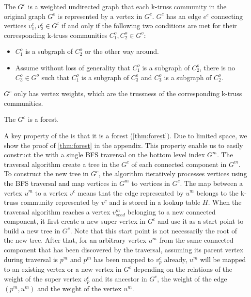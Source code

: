 \begin{Def}[\Treeindex{}]
The \treeindex{} $G^c$ is a weighted undirected graph that each k-truss community in the original graph $G^o$ is represented by a vertex in $G^c$. $G^c$ has an edge $e^c$ connecting vertices $v^{c}_{1}, v^{c}_{2} \in G^{t}$ if and only if the following two conditions are met for their corresponding k-truss communities $C^{o}_{1}, C^{o}_{2} \in G^{o}$:
\begin{itemize}
	\item $C^{o}_{1}$ is a subgraph of $C^{o}_{2}$ or the other way around.
	\item Assume without loss of generality that $C^{o}_{1}$ is a subgraph of $C^{o}_{2}$, there is no $C^{o}_{3} \in G^{o}$ such that $C^{o}_{1}$ is a subgraph of $C^{o}_{3}$ and $C^{o}_{3}$ is a subgraph of $C^{o}_{2}$.
\end{itemize}
$G^c$ only has vertex weights, which are the trussness of the corresponding k-truss communities.
\label{def:\treeindex{}}
\end{Def}

\begin{Thm}
The \treeindex{} $G^c$ is a forest.
\label{thm:forest}
\end{Thm}

A key property of the \treeindex{} is that it is a forest (\autoref{thm:forest}). Due to limited space, we show the proof of \autoref{thm:forest} in the appendix. This property enable us to easily construct the \treeindex{} with a single BFS traversal on the bottom level index $G^m$. The traversal algorithm create a tree in the \treeindex{} $G^c$ of each connected component in $G^m$. To construct the new tree in $G^c$, the algorithm iteratively processes vertices using the BFS traversal and map vertices in $G^m$ to vertices in $G^c$. The map between a vertex $u^m$ to a vertex $v^c$ means that the edge represented by $u^m$ belongs to the k-truss community represented by $v^c$ and is stored in a lookup table $H$. When the traversal algorithm reaches a vertex $v^{m}_{seed}$ belonging to a new connected component, it first create a new super vertex in $G^c$ and use it as a start point to build a new tree in $G^c$. Note that this start point is not necessarily the root of the new tree. After that, for an arbitrary vertex $u^m$ from the same connected component that has been discovered by the traversal, assuming its parent vertex during traversal is $p^m$ and $p^m$ has been mapped to $v^{c}_{p}$ already, $u^m$ will be mapped to an existing vertex or a new vertex in $G^c$ depending on the relations of the weight of the super vertex $v^{c}_{p}$ and its ancestor in $G^c$, the weight of the edge $(p^m, u^m)$ and the weight of the vertex $u^m$.

